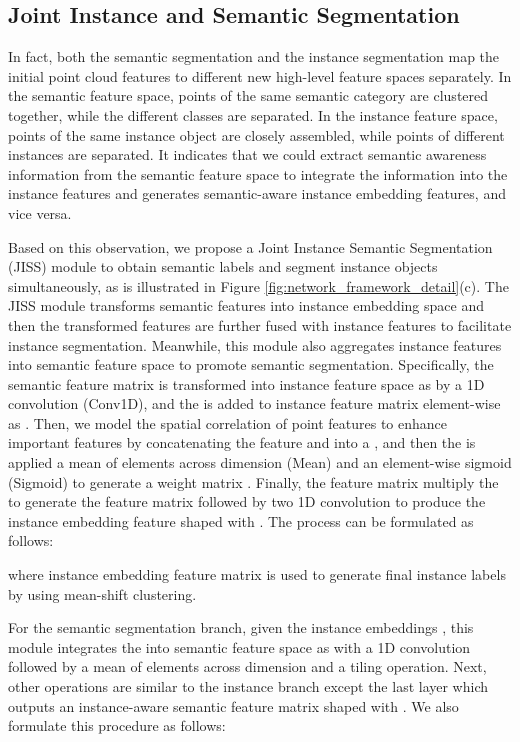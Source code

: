 \documentclass[letterpaper]{article} \usepackage{aaai20}  \usepackage{times}  \usepackage{helvet} \usepackage{courier}  \usepackage[hyphens]{url}  \usepackage{graphicx} \urlstyle{rm} \def\UrlFont{\rm}  \usepackage{graphicx}  \frenchspacing  \setlength{\pdfpagewidth}{8.5in}  \setlength{\pdfpageheight}{11in}
\begin{document}
\subsection{Joint Instance and Semantic Segmentation}
In fact, both the semantic segmentation and the instance segmentation map the initial point cloud features to different new high-level feature spaces separately. In the semantic feature space, points of the same semantic category are clustered together, while the different classes are separated. In the instance feature space, points of the same instance object are closely assembled, while points of different instances are separated. It indicates that we could extract semantic awareness information from the semantic feature space to integrate the information  into the instance features and generates semantic-aware instance embedding features, and vice versa.

Based on this observation, we propose a Joint Instance Semantic Segmentation (JISS) module to obtain semantic labels and segment instance objects simultaneously, as is illustrated in Figure \ref{fig:network_framework_detail}(c). The JISS module transforms semantic features into instance embedding space and then the transformed features are further fused with instance features to facilitate instance segmentation. Meanwhile, this module also aggregates instance features into semantic feature space to promote semantic segmentation. Specifically, the semantic feature matrix  is transformed into instance feature space as  by a 1D convolution (Conv1D), and the  is added to instance feature matrix  element-wise as . Then, we model the spatial correlation of point features to enhance important features by concatenating the feature  and  into a , and then the  is applied a mean of elements across dimension (Mean) and an element-wise sigmoid (Sigmoid) to generate a weight matrix . Finally, the feature matrix  multiply the  to generate the feature matrix   followed by two 1D convolution to produce the instance embedding feature  shaped with . The process can be formulated as follows:




where instance embedding feature matrix  is used to generate final instance labels by using mean-shift clustering.

For the semantic segmentation branch, given the instance embeddings , this module integrates the  into semantic feature space as  with a 1D convolution followed by a mean of elements across dimension and a tiling operation. Next, other operations are similar to the instance branch except the last layer which outputs an instance-aware semantic feature matrix  shaped with . We also formulate this procedure as follows:
\end{document}

